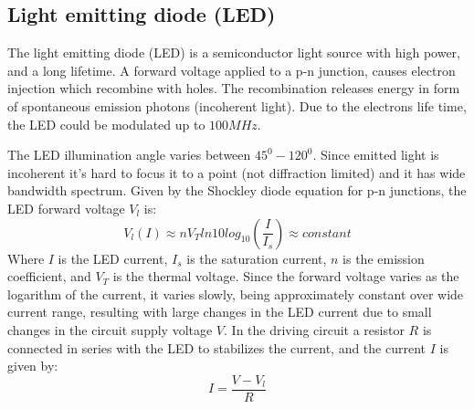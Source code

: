 \documentclass[\main/master.tex]{subfiles}
\begin{document}
\subsection{Light emitting diode (LED)}
The light emitting diode (LED) is a semiconductor light source with high power, and a long lifetime. A forward voltage applied to a p-n junction, causes electron injection which recombine with holes. The recombination releases energy in form of spontaneous emission photons (incoherent light). Due to the electrons life time, the LED could be modulated up to $100MHz$.
\par\noindent
The LED illumination angle varies between $45^0-120^0$. Since emitted light is incoherent it's hard to focus it to a point (not diffraction limited) and it has wide bandwidth spectrum. Given by the Shockley diode equation for p-n junctions, the LED forward voltage $V_l$ is:
\begin{equation}
V_l(I) \approx n V_T ln10 log_{10} (\frac{I}{I_s})\approx constant \label{eqn:led voltage}
\end{equation}
Where $I$ is the LED current, $I_s$ is the saturation current, $n$ is the emission coefficient, and $V_T$ is the thermal voltage. Since the forward voltage varies as the logarithm of the current, it varies slowly, being approximately constant over wide current range, resulting with large changes in the LED current due to small changes in the circuit supply voltage $V$. In the driving circuit a resistor $R$ is connected in series with the LED to stabilizes the current, and the current $I$ is given by:
\begin{equation}
I =\frac{V-V_l}{R} \label{eqn:led circuit}
\end{equation}
\end{document}
